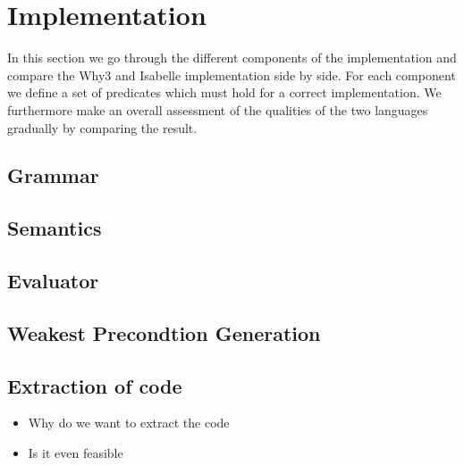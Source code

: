\section{Implementation}
In this section we go through the different components of the implementation and compare the Why3 and Isabelle
implementation side by side.
For each component we define a set of predicates which must hold for a correct implementation.
We furthermore make an overall assessment of the qualities of the two languages gradually by comparing the result.

\subsection{Grammar}

\subsection{Semantics}

\subsection{Evaluator}

\subsection{Weakest Precondtion Generation}

\subsection{Extraction of code}
\begin{itemize}
\item Why do we want to extract the code
  \item Is it even feasible
\end{itemize}